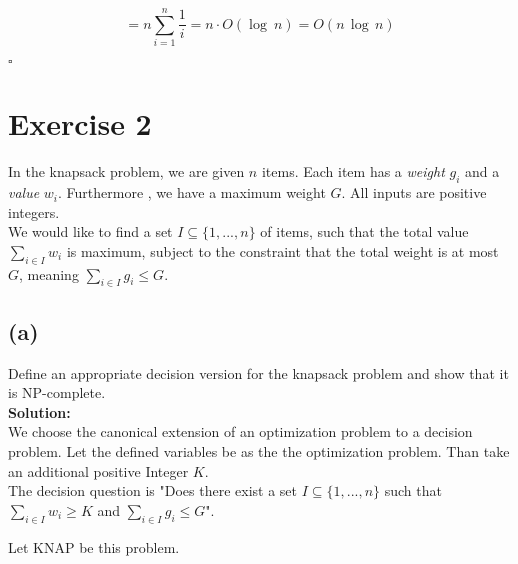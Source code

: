 \documentclass[11pt,a4paper,ngerman]{article}
\begin{document}
\[
=n\sum_{i=1}^{n}\frac{1}{i}=n\cdot O(\log\: n)=O(n\, \log\, n)
\]


\mbox{} \hfill $\square$



\section*{Exercise 2}

In the knapsack problem, we are given $n$ items. Each item has a \emph{weight} $g_i$ and a \emph{value} $w_i$.
Furthermore , we have a maximum weight $G$. All inputs are positive integers.\\

We would like to find a set $I \subseteq \{ 1,...,n \}$ of items, such that the total value
$\underset{i \in I}{\sum} w_i$ is maximum, subject to the constraint that the total weight is at most
$G$, meaning $\underset{i \in I}{\sum} g_i \leq G$.

\subsection*{(a)} 

Define an appropriate decision version for the knapsack problem and show that it is NP-complete.\\

\textbf{Solution:}\\
We choose the canonical extension of an optimization problem to a decision problem. Let the defined variables
be as the the optimization problem. Than take an additional positive Integer $K$.\\

The decision question is "Does there exist a set $I \subseteq \{ 1, ... , n \}$ such that
$\underset{i \in I}{\sum} w_i \geq K$ and $\underset{ i \in I}{\sum} g_i \leq G$".

Let KNAP be this problem.
\end{document}
